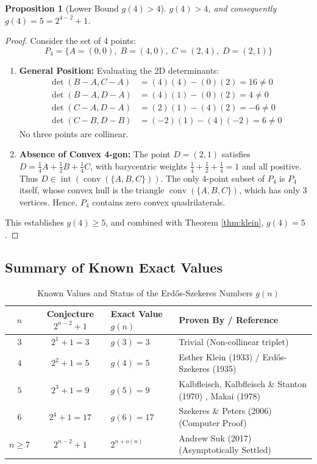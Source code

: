 \documentclass[11pt,a4paper]{article}
\newtheorem{proposition}[theorem]{Proposition}
\theoremstyle{definition}
\begin{document}
\begin{proposition}[Lower Bound $g(4) > 4$]\label{prop:g4_lower}
$g(4) > 4$, and consequently $g(4) = 5 = 2^{4-2} + 1$.
\end{proposition}

\begin{proof}
Consider the set of 4 points:
\[ P_4 = \{ A=(0, 0), \; B=(4, 0), \; C=(2, 4), \; D=(2, 1) \} \]
\begin{enumerate}
    \item \textbf{General Position:}
    Evaluating the 2D determinants:
    \begin{align*}
    \det(B-A, C-A) &= (4)(4) - (0)(2) = 16 \ne 0 \\
    \det(B-A, D-A) &= (4)(1) - (0)(2) = 4 \ne 0 \\
    \det(C-A, D-A) &= (2)(1) - (4)(2) = -6 \ne 0 \\
    \det(C-B, D-B) &= (-2)(1) - (4)(-2) = 6 \ne 0
    \end{align*}
    No three points are collinear.
    \item \textbf{Absence of Convex 4-gon:}
    The point $D = (2, 1)$ satisfies $D = \frac{1}{4} A + \frac{1}{2} B + \frac{1}{4} C$, with barycentric weights $\frac{1}{4} + \frac{1}{2} + \frac{1}{4} = 1$ and all positive.
    Thus $D \in \operatorname{int}(\operatorname{conv}(\{A, B, C\}))$.
    The only 4-point subset of $P_4$ is $P_4$ itself, whose convex hull is the triangle $\operatorname{conv}(\{A, B, C\})$, which has only 3 vertices.
    Hence, $P_4$ contains zero convex quadrilaterals.
\end{enumerate}
This establishes $g(4) \ge 5$, and combined with Theorem \ref{thm:klein}, $g(4) = 5$.
\end{proof}

\subsection{Summary of Known Exact Values}

\begin{table}[ht]
\centering
\small
\caption{Known Values and Status of the Erd\H{o}s-Szekeres Numbers $g(n)$}
\label{tab:gn_values}
\vspace{0.5em}
\begin{tabular}{@{}ccll@{}}
\toprule
$n$ & Conjecture $2^{n-2} + 1$ & Exact Value $g(n)$ & Proven By / Reference \\
\midrule
$3$ & $2^1 + 1 = 3$ & $g(3) = 3$ & Trivial (Non-collinear triplet) \\
$4$ & $2^2 + 1 = 5$ & $g(4) = 5$ & Esther Klein (1933) / Erd\H{o}s-Szekeres (1935) \cite{erdos1935} \\
$5$ & $2^3 + 1 = 9$ & $g(5) = 9$ & Kalbfleisch, Kalbfleisch \& Stanton (1970) \cite{kalbfleisch1970}, Makai (1978) \\
$6$ & $2^4 + 1 = 17$ & $g(6) = 17$ & Szekeres \& Peters (2006) \cite{szekeres2006} (Computer Proof) \\
$n \ge 7$ & $2^{n-2} + 1$ & $2^{n + o(n)}$ & Andrew Suk (2017) \cite{suk2017} (Asymptotically Settled) \\
\bottomrule
\end{tabular}
\end{table}
\end{document}
